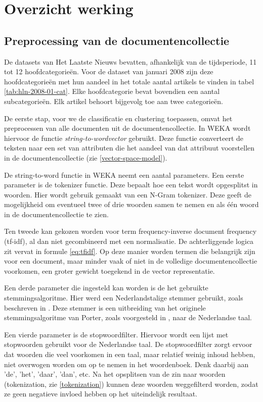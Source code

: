 \chapter{Overzicht werking}

\section{Preprocessing van de documentencollectie}\label{preprocessing}
De datasets van Het Laatste Nieuws bevatten, afhankelijk van de tijdsperiode, 11 tot 12 hoofdcategorie\"en. Voor de dataset van januari 2008 zijn deze hoofdcategorie\"en met hun aandeel in het totale aantal artikels te vinden in tabel \ref{tab:hln-2008-01-cat}. Elke hoofdcategorie bevat bovendien een aantal subcategorie\"en. Elk artikel behoort bijgevolg toe aan twee categorie\"en. 

De eerste stap, voor we de classificatie en clustering toepassen, omvat het preprocessen van alle documenten uit de documentencollectie. In WEKA wordt hiervoor de functie \textit{string-to-wordvector} gebruikt. Deze functie converteert de teksten naar een set van attributen die het aandeel van dat attribuut voorstellen in de documentencollectie (zie \ref{vector-space-model}). 

De string-to-word functie in WEKA neemt een aantal parameters. Een eerste parameter is de tokenizer functie. Deze bepaalt hoe een tekst wordt opgesplitst in woorden. Hier wordt gebruik gemaakt van een N-Gram tokenizer. Deze geeft de mogelijkheid om eventueel twee of drie woorden samen te nemen en als \'e\'en woord in de documentencollectie te zien.

Ten tweede kan gekozen worden voor term frequency-inverse document frequency (tf-idf), al dan niet gecombineerd met een normalisatie. De achterliggende logica zit vervat in formule \ref{eq:tfidf}. Op deze manier worden termen die belangrijk zijn voor een document, maar minder vaak of niet in de volledige documentencollectie voorkomen, een groter gewicht toegekend in de vector representatie. 

Een derde parameter die ingesteld kan worden is de het gebruikte stemmingsalgoritme. Hier werd een Nederlandstalige stemmer gebruikt, zoals beschreven in \cite{Kraaij1994}. Deze stemmer is een uitbreiding van het originele stemmingsalgoritme van Porter, zoals voorgesteld in \cite{Porter1980}, naar de Nederlandse taal. 

Een vierde parameter is de stopwoordfilter. Hiervoor wordt een lijst met stopwoorden gebruikt voor de Nederlandse taal. De stopwoordfilter zorgt ervoor dat woorden die veel voorkomen in een taal, maar relatief weinig inhoud hebben, niet overwogen worden om op te nemen in het woordenboek. Denk daarbij aan 'de', 'het', 'daar', 'dan', etc. Na het opsplitsen van de zin naar woorden (tokenization, zie \ref{tokenization}) kunnen deze woorden weggefilterd worden, zodat ze geen negatieve invloed hebben op het uiteindelijk resultaat.

